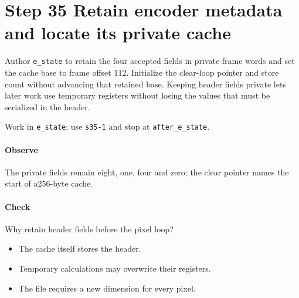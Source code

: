 \section{Step 35 Retain encoder metadata and locate its private cache}\label{qoi-s35}
Author \texttt{e\_state} to retain the four accepted fields in private frame words and set the cache base to frame offset 112. Initialize the clear-loop pointer and store count without advancing that retained base. Keeping header fields private lets later work use temporary registers without losing the values that must be serialized in the header.

Work in \texttt{e\_state}; use \texttt{s35-1} and stop at \texttt{after\_e\_state}.

\paragraph{Observe} The private fields remain eight, one, four and zero; the clear pointer names the start of a256-byte cache.

\paragraph{Check} Why retain header fields before the pixel loop?
\begin{itemize}
  \item[A.] The cache itself stores the header.
  \item[B.] Temporary calculations may overwrite their registers.
  \item[C.] The file requires a new dimension for every pixel.
\end{itemize}
